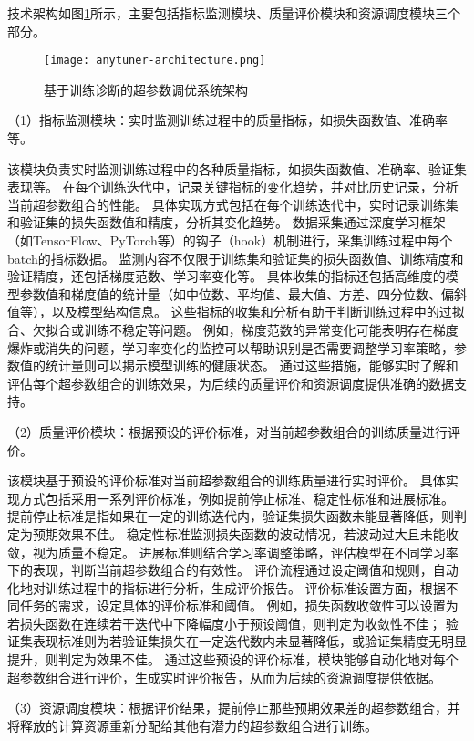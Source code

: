 技术架构如图\ref{fig:anytunerarch}所示，主要包括指标监测模块、质量评价模块和资源调度模块三个部分。

\begin{figure}
  \centering
  \texttt{[image: anytuner-architecture.png]}
  \caption{基于训练诊断的超参数调优系统架构}
  \label{fig:anytunerarch}
\end{figure}

（1）指标监测模块：实时监测训练过程中的质量指标，如损失函数值、准确率等。

该模块负责实时监测训练过程中的各种质量指标，如损失函数值、准确率、验证集表现等。
在每个训练迭代中，记录关键指标的变化趋势，并对比历史记录，分析当前超参数组合的性能。
具体实现方式包括在每个训练迭代中，实时记录训练集和验证集的损失函数值和精度，分析其变化趋势。
数据采集通过深度学习框架（如TensorFlow、PyTorch等）的钩子（hook）机制进行，采集训练过程中每个batch的指标数据。
监测内容不仅限于训练集和验证集的损失函数值、训练精度和验证精度，还包括梯度范数、学习率变化等。
具体收集的指标还包括高维度的模型参数值和梯度值的统计量（如中位数、平均值、最大值、方差、四分位数、偏斜值等），以及模型结构信息。
这些指标的收集和分析有助于判断训练过程中的过拟合、欠拟合或训练不稳定等问题。
例如，梯度范数的异常变化可能表明存在梯度爆炸或消失的问题，学习率变化的监控可以帮助识别是否需要调整学习率策略，参数值的统计量则可以揭示模型训练的健康状态。
通过这些措施，能够实时了解和评估每个超参数组合的训练效果，为后续的质量评价和资源调度提供准确的数据支持。

（2）质量评价模块：根据预设的评价标准，对当前超参数组合的训练质量进行评价。

该模块基于预设的评价标准对当前超参数组合的训练质量进行实时评价。
具体实现方式包括采用一系列评价标准，例如提前停止标准、稳定性标准和进展标准。
提前停止标准是指如果在一定的训练迭代内，验证集损失函数未能显著降低，则判定为预期效果不佳。
稳定性标准监测损失函数的波动情况，若波动过大且未能收敛，视为质量不稳定。
进展标准则结合学习率调整策略，评估模型在不同学习率下的表现，判断当前超参数组合的有效性。
评价流程通过设定阈值和规则，自动化地对训练过程中的指标进行分析，生成评价报告。
评价标准设置方面，根据不同任务的需求，设定具体的评价标准和阈值。
例如，损失函数收敛性可以设置为若损失函数在连续若干迭代中下降幅度小于预设阈值，则判定为收敛性不佳；
验证集表现标准则为若验证集损失在一定迭代数内未显著降低，或验证集精度无明显提升，则判定为效果不佳。
通过这些预设的评价标准，模块能够自动化地对每个超参数组合进行评价，生成实时评价报告，从而为后续的资源调度提供依据。

（3）资源调度模块：根据评价结果，提前停止那些预期效果差的超参数组合，并将释放的计算资源重新分配给其他有潜力的超参数组合进行训练。

